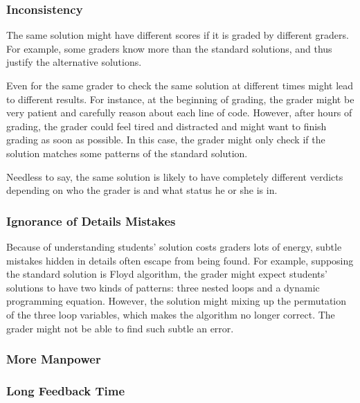         \subsubsection{Inconsistency}

            The same solution might have different scores if it is graded by different graders.
            For example, some graders know more than the standard solutions,
            and thus justify the alternative solutions.

            Even for the same grader to check the same solution at different times might lead to different results.
            For instance, at the beginning of grading, the grader might be very patient
            and carefully reason about each line of code.
            However, after hours of grading, the grader could feel tired and distracted
            and might want to finish grading as soon as possible.
            In this case, the grader might only check if the solution matches some patterns of the standard solution.

            Needless to say, the same solution is likely to have completely different verdicts
            depending on who the grader is and what status he or she is in.

        \subsubsection{Ignorance of Details Mistakes}

            Because of understanding students' solution costs graders lots of energy,
            subtle mistakes hidden in details often escape from being found.
            For example, supposing the standard solution is Floyd algorithm, %
            the grader might expect students' solutions to have two kinds of patterns:
            three nested loops and a dynamic programming equation.
            However, the solution might mixing up the permutation of the three loop variables,
            which makes the algorithm no longer correct.
            The grader might not be able to find such subtle an error.

        \subsubsection{More Manpower}

        \subsubsection{Long Feedback Time}

